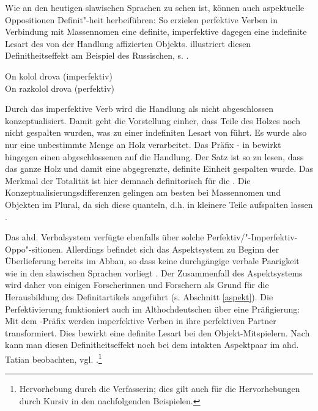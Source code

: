 Wie an den heutigen slawischen Sprachen zu sehen ist, können auch aspektuelle  Oppositionen Definit"-heit  herbeiführen: So erzielen perfektive  Verben in Verbindung mit Massennomen  eine definite, imperfektive  dagegen eine indefinite Lesart  des von der Handlung affizierten Objekts. \textcite[11--14]{Leiss2000} illustriert diesen Definitheitseffekt  am Beispiel des Russischen, s. .

\begin{exe}
\settowidth{}
	\ex \label{ex:russ-aspekt}   
	\begin{xlist}
		\ex \label{ex:russ-imper} On kolol drova \hfill (imperfektiv)\\  
		\ex \label{ex:russ-per} On razkolol drova  \hfill(perfektiv)\\ 
		\end{xlist}
\end{exe}
\noindent
Durch das imperfektive  Verb  wird die Handlung als nicht abgeschlossen konzeptualisiert. Damit  geht die Vorstellung einher, dass Teile des Holzes noch nicht gespalten wurden, was zu einer indefiniten Lesart  von   führt. Es wurde also nur eine unbestimmte Menge an Holz verarbeitet. Das Präfix  - in  bewirkt hingegen einen abgeschlossenen   auf die Handlung. Der Satz ist so zu lesen, dass das ganze Holz und damit eine abgegrenzte, definite Einheit gespalten wurde.
Das Merkmal der Totalität ist hier demnach definitorisch für die  \parencite[14]{Leiss2000}. Die Konzeptualisierungsdifferenzen gelingen am besten bei Massennomen  und Objekten  im Plural, da sich diese quanteln, d.h. in kleinere Teile aufspalten lassen \parencite{Heindl2016}. 

Das ahd. Verbalsystem verfügte ebenfalls über solche  Perfektiv/"-Imperfektiv-Oppo"-sitionen. Allerdings befindet sich das Aspektsystem  zu Beginn der Überlieferung bereits im Abbau, so dass keine durchgängige verbale Paarigkeit wie in den slawischen Sprachen vorliegt \parencite[3]{Eroms1997}. Der Zusammenfall des Aspektsystems  wird daher von einigen Forscherinnen und Forschern als Grund für die Herausbildung des Definitartikels  angeführt (s. Abschnitt \ref{aspekt}). Die Perfektivierung  funktioniert auch im Althochdeutschen über eine Präfigierung: Mit dem  -Präfix werden imperfektive  Verben in ihre perfektiven  Partner transformiert. Dies bewirkt eine definite Lesart bei den  Objekt-Mitspielern. Nach \textcite[176--181]{Leiss2000} kann man diesen Definitheitseffekt  noch bei dem intakten Aspektpaar   im ahd. Tatian beobachten, vgl. .\footnote{Hervorhebung durch die Verfasserin; dies gilt auch für die Hervorhebungen durch Kursiv in den nachfolgenden Beispielen.}   

